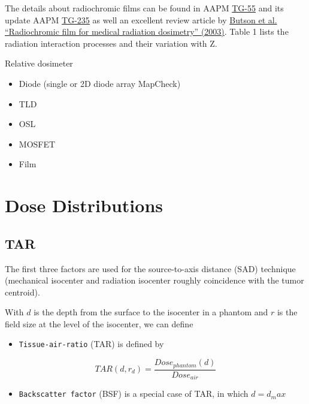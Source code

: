 \documentclass[]{book}
\providecommand{\tightlist}{%
  \setlength{\itemsep}{0pt}\setlength{\parskip}{0pt}}
\theoremstyle{definition}
\theoremstyle{definition}
\theoremstyle{definition}
\theoremstyle{remark}
\begin{document}
The details about radiochromic films can be found in AAPM
\href{http://www.aapm.org/pubs/reports/RPT_216.pdf}{TG-55} and its
update AAPM
\href{http://www.aapm.org/org/structure/default.asp?committee_code=TG235}{TG-235}
as well an excellent review article by
\href{http://hepweb03.phys.sinica.edu.tw/opto/Irradiation/RadioChromic/Documents/MSE41_61.pdf}{Butson
et al. ``Radiochromic film for medical radiation dosimetry'' (2003)}.
Table 1 lists the radiation interaction processes and their variation
with Z.

Relative dosimeter

\begin{itemize}
\tightlist
\item
  Diode (single or 2D diode array MapCheck)
\item
  TLD
\item
  OSL
\item
  MOSFET
\item
  Film
\end{itemize}

\chapter{Dose Distributions}\label{distribution}

\section{TAR}\label{tar}

The first three factors are used for the source-to-axis distance (SAD)
technique (mechanical isocenter and radiation isocenter roughly
coincidence with the tumor centroid).

With \(d\) is the depth from the surface to the isocenter in a phantom
and \(r\) is the field size at the level of the isocenter, we can define

\begin{itemize}
\tightlist
\item
  \texttt{Tissue-air-ratio} (TAR) is defined by
\end{itemize}

\begin{equation}
  TAR(d,r_d) = \frac{Dose_{phantom}(d)}{Dose_{air}}
  \label{eq:tar}
\end{equation}

\begin{itemize}
\tightlist
\item
  \texttt{Backscatter\ factor} (BSF) is a special case of TAR, in which
  \(d=d_max\)
\end{itemize}
\end{document}
